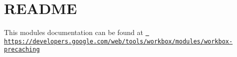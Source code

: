 \chapter{README}
\hypertarget{md_node__modules_2workbox-precaching_2README}{}\label{md_node__modules_2workbox-precaching_2README}
This module\textquotesingle{}s documentation can be found at \href{https://developers.google.com/web/tools/workbox/modules/workbox-precaching}{\texttt{ https\+://developers.\+google.\+com/web/tools/workbox/modules/workbox-\/precaching}} 